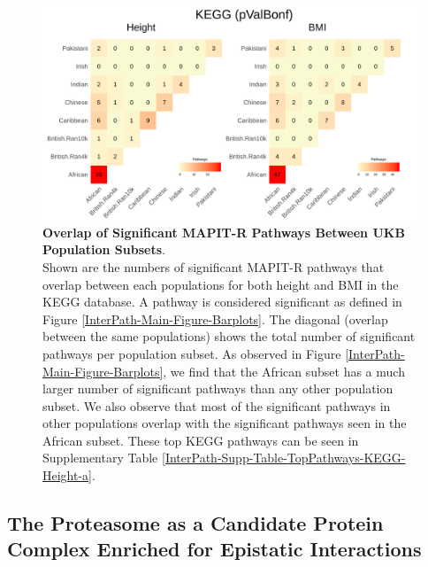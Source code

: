 \documentclass[12pt, a4paper]{article}
\begin{document}
\begin{figure}[htbp]
\centering
\includegraphics[scale=.225]{Images/Main/InterPath_Main_Figure_Heatplots_KEGG_vs1.png}
\caption[TBD]{\textbf{Overlap of Significant MAPIT-R Pathways Between UKB Population Subsets}. \\ Shown are the numbers of significant MAPIT-R pathways that overlap between each populations for both height and BMI in the KEGG database. A pathway is considered significant as defined in Figure \ref{InterPath-Main-Figure-Barplots}. The diagonal (overlap between the same populations) shows the total number of significant pathways per population subset. As observed in Figure \ref{InterPath-Main-Figure-Barplots}, we find that the African subset has a much larger number of significant pathways than any other population subset. We also observe that most of the significant pathways in other populations overlap with the significant pathways seen in the African subset. These top KEGG pathways can be seen in Supplementary Table \ref{InterPath-Supp-Table-TopPathways-KEGG-Height-a}.}
\label{InterPath-Main-Figure-Heatplots-KEGG}
\end{figure}

\subsection{The Proteasome as a Candidate Protein Complex Enriched for Epistatic Interactions}
\end{document}
